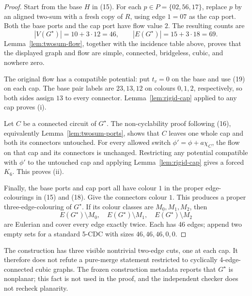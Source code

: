\documentclass[11pt]{article}
\theoremstyle{definition}
\theoremstyle{remark}
\begin{document}
\begin{proof}
Start from the base \(H\) in (15).  For each
\(p\in P=\{02,56,17\}\), replace \(p\) by an aligned two-sum with a
fresh copy of \(R\), using edge \(1=07\) as the cap port.  Both the base
ports and the cap port have flow value \(2\).  The resulting counts are
\[
 |V(G^\star)|=10+3\cdot12=46,\qquad
 |E(G^\star)|=15+3\cdot18=69.
\]
Lemma~\ref{lem:twosum-flow}, together with the incidence table above,
proves that the displayed graph and flow are simple, connected,
bridgeless, cubic, and nowhere zero.

The original flow has a compatible potential: put \(t_v=0\) on the base
and use (19) on each cap.  The base pair labels are \(23,13,12\) on
colours \(0,1,2\), respectively, so both sides assign \(13\) to every
connector.  Lemma~\ref{lem:rigid-cap} applied to any cap proves (i).

Let \(C\) be a connected circuit of \(G^\star\).  The non-cyclability
proof following (16), equivalently Lemma~\ref{lem:twosum-ports}, shows
that \(C\) leaves one whole cap and both its connectors untouched.
For every allowed switch \(\phi'=\phi+a\chi_C\), the flow on that cap
and its connectors is unchanged.  Restricting any potential compatible
with \(\phi'\) to the untouched cap and applying
Lemma~\ref{lem:rigid-cap} gives a forced \(K_6\).  This proves (ii).

Finally, the base ports and cap port all have colour \(1\) in the proper
edge-colourings in (15) and (18).  Give the connectors colour \(1\).
This produces a proper three-edge-colouring of \(G^\star\).  If its
colour classes are \(M_0,M_1,M_2\), then
\[
 E(G^\star)\setminus M_0,\quad
 E(G^\star)\setminus M_1,\quad
 E(G^\star)\setminus M_2
\]
are Eulerian and cover every edge exactly twice.  Each has 46 edges;
append two empty sets for a standard 5-CDC with sizes
\(46,46,46,0,0\).
\end{proof}

The construction has three visible nontrivial two-edge cuts, one at each
cap.  It therefore does not refute a pure-merge statement restricted to
cyclically 4-edge-connected cubic graphs.  The frozen construction
metadata reports that \(G^\star\) is nonplanar; this fact is not used in
the proof, and the independent checker does not recheck planarity.
\end{document}
